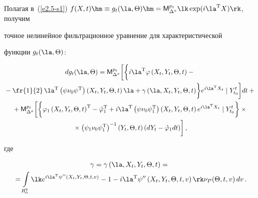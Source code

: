 Полагая в~(\ref{e2.5-s1}) $f(X,t) \hm\equiv g_t (\la,\Theta)\hm =

{\sf M}_{\Delta^x}^{p_t}\lk\exp (i\la^{\mathrm{T}} X)\rk$, получим

точное нелинейное фильтрационное уравнение для  характеристической 

функции $g_t (\la,\Theta)$:

\begin{multline}

dg_t (\la,\Theta) = {\sf M}_{\Delta^x}^{p_t} \biggl[\biggl\{ 

i\la^{\mathrm{T}} \varphi \left(X_t,Y_t,\Theta, t\right) -{}\\

{}- \fr{1}{2}\, \la^{\mathrm{T}} \left(

\psi\nu_0\psi^{\mathrm{T}}\right) 

\left(X_t,Y_t,\Theta, t\right) \la+\gamma \left(\la, X_t, Y_t, \Theta, t\right) 

\biggr\}

 e^{i\la^{\mathrm{T}} X_t} \mid Y_{t_0}^t \biggr] dt+{}\\

 {}+ 

{\sf M}_{\Delta^x}^{p_t} \biggl[ \biggl\{ \varphi_1 \left(X_t,Y_t,\Theta, t\right)^{\mathrm{T}} 

-\hat\varphi_1^{\mathrm{T}} +  i\la^{\mathrm{T}} \left(\psi\nu_0\psi_1^{\mathrm{T}}\right) \left(X_t,Y_t, \Theta,t\right) 

 e^{i\la^{\mathrm{T}} X_t} \mid Y_{t_0}^t \biggr\}\times{}\\

 {}\times \left(\psi_1\nu_0\psi_1^{\mathrm{T}}\right)^{-1} 

  \left(Y_t,\Theta,t\right) \left(dY_t-\hat\varphi_1

    dt\right)\biggr]\,, \label{e2.9-s1}

    \end{multline}

где

 \begin{multline}

 \gamma=\gamma \left(\la, X_t, Y_t, \Theta, t\right)={}\\

 {}=

 \int\limits_{R_0^q}\lk e^{i\la^{\mathrm{T}} \psi''(X_t,Y_t,\Theta, t,v)} - 1

    - i\la^{\mathrm{T}} \psi''\left(X_t,Y_t,\Theta, t,v\right)\rk \nu_P (\Theta, t,v)\, dv\,.

    \label{e2.10-s1}

    \end{multline}



